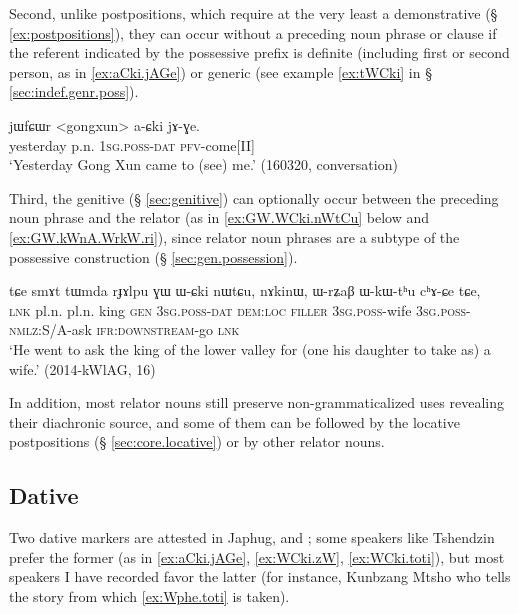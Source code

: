 Second, unlike postpositions, which require at the very least a demonstrative (§ \ref{ex:postpositions}), they can occur without a preceding noun phrase or clause if the referent indicated by the possessive prefix is definite (including first or second person, as in \ref{ex:aCki.jAGe}) or generic (see example \ref{ex:tWCki} in § \ref{sec:indef.genr.poss}). 

\begin{exe}
\ex \label{ex:aCki.jAGe}
\gll jɯfɕɯr <gongxun> a-ɕki jɤ-ɣe. \\
yesterday p.n. \textsc{1sg}.\textsc{poss}-\textsc{dat} \textsc{pfv}-come[II] \\
\glt `Yesterday Gong Xun came to (see) me.' (160320, conversation)
\end{exe}

Third, the genitive  (§ \ref{sec:genitive}) can optionally occur between the preceding noun phrase and the relator (as in \ref{ex:GW.WCki.nWtCu} below and \ref{ex:GW.kWnA.WrkW.ri}), since relator noun phrases are a subtype of the possessive construction (§ \ref{sec:gen.possession}).

\begin{exe}
\ex \label{ex:GW.WCki.nWtCu}
\gll tɕe smɤt tɯmda rɟɤlpu ɣɯ ɯ-ɕki nɯtɕu, nɤkinɯ, ɯ-rʑaβ ɯ-kɯ-tʰu cʰɤ-ɕe tɕe, \\
\textsc{lnk} pl.n. pl.n. king \textsc{gen} \textsc{3sg}.\textsc{poss}-\textsc{dat} \textsc{dem}:\textsc{loc} \textsc{filler} \textsc{3sg}.\textsc{poss}-wife \textsc{3sg}.\textsc{poss}-\textsc{nmlz}:S/A-ask \textsc{ifr}:\textsc{downstream}-go \textsc{lnk} \\
\glt `He went to ask the king of the lower valley for (one his daughter to take as) a wife.' (2014-kWlAG, 16)
\end{exe}

In addition, most relator nouns still preserve non-grammaticalized uses revealing their diachronic source, and some of them can be followed by the locative postpositions (§ \ref{sec:core.locative}) or by other relator nouns.

\subsection{Dative} \label{sec:dative} 
Two dative markers are attested in Japhug,  and ; some speakers like Tshendzin prefer the former (as in \ref{ex:aCki.jAGe}, \ref{ex:WCki.zW}, \ref{ex:WCki.toti}), but most speakers I have recorded favor the latter (for instance, Kunbzang Mtsho who tells the story from which \ref{ex:Wphe.toti} is taken).

